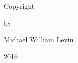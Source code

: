
\vspace*{\fill}
\begin{center}
Copyright
\end{center}
\begin{center}
by
\end{center}
\begin{center}
Michael William Levin
\end{center}
\begin{center}
2016
\end{center}

\vspace*{\fill}